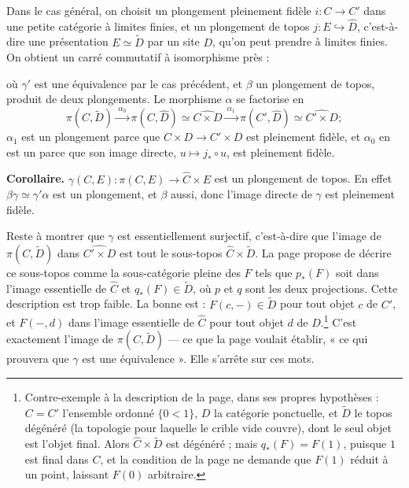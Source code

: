 \documentclass[11pt,a4paper]{article}
\begin{document}
Dans le cas général, on choisit un plongement pleinement fidèle $i : C \to C'$
dans une petite catégorie à limites finies, et un plongement de topos
$j : E \hookrightarrow \widehat{D}$, c'est-à-dire une présentation
$E \simeq \widetilde{D}$ par un site $D$, qu'on peut prendre à limites
finies. On obtient un carré commutatif à isomorphisme près :


où $\gamma'$ est une équivalence par le cas précédent, et $\beta$ un plongement
de topos, produit de deux plongements. Le morphisme $\alpha$ se factorise en
\[
\pi(C, \widetilde{D}) \xrightarrow{\ \alpha_0\ } \pi(C, \widehat{D}) \simeq \widehat{C \times D}
\xrightarrow{\ \alpha_1\ } \pi(C', \widehat{D}) \simeq \widehat{C' \times D} ;
\]
$\alpha_1$ est un plongement parce que $C \times D \to C' \times D$ est
pleinement fidèle, et $\alpha_0$ en est un parce que son image directe,
$u \mapsto j_* \circ u$, est pleinement fidèle.

\textbf{Corollaire.} $\gamma(C, E) : \pi(C, E) \to \widehat{C} \times E$ est un
plongement de topos. En effet $\beta\gamma \simeq \gamma'\alpha$ est un
plongement, et $\beta$ aussi, donc l'image directe de $\gamma$ est pleinement
fidèle.

Reste à montrer que $\gamma$ est essentiellement surjectif, c'est-à-dire que
l'image de $\pi(C, \widetilde{D})$ dans $\widehat{C' \times D}$ est tout le
sous-topos $\widehat{C} \times \widetilde{D}$. La page propose de décrire ce
sous-topos comme la sous-catégorie pleine des $F$ tels que $p_*(F)$ soit dans
l'image essentielle de $\widehat{C}$ et $q_*(F) \in \widetilde{D}$, où $p$ et $q$
sont les deux projections. Cette description est trop faible. La bonne est :
$F(c, -) \in \widetilde{D}$ pour tout objet $c$ de $C'$, et $F(-, d)$ dans
l'image essentielle de $\widehat{C}$ pour tout objet $d$ de $D$.\footnote{Contre-exemple
à la description de la page, dans ses propres hypothèses : $C = C'$ l'ensemble
ordonné $\{0 < 1\}$, $D$ la catégorie ponctuelle, et $\widetilde{D}$ le topos
dégénéré (la topologie pour laquelle le crible vide couvre), dont le seul objet
est l'objet final. Alors $\widehat{C} \times \widetilde{D}$ est dégénéré ; mais
$q_*(F) = F(1)$, puisque $1$ est final dans $C$, et la condition de la page ne
demande que $F(1)$ réduit à un point, laissant $F(0)$ arbitraire.} C'est
exactement l'image de $\pi(C, \widetilde{D})$ --- ce que la page voulait
établir, « ce qui prouvera que $\gamma$ est une équivalence ». Elle s'arrête sur
ces mots.
\end{document}
